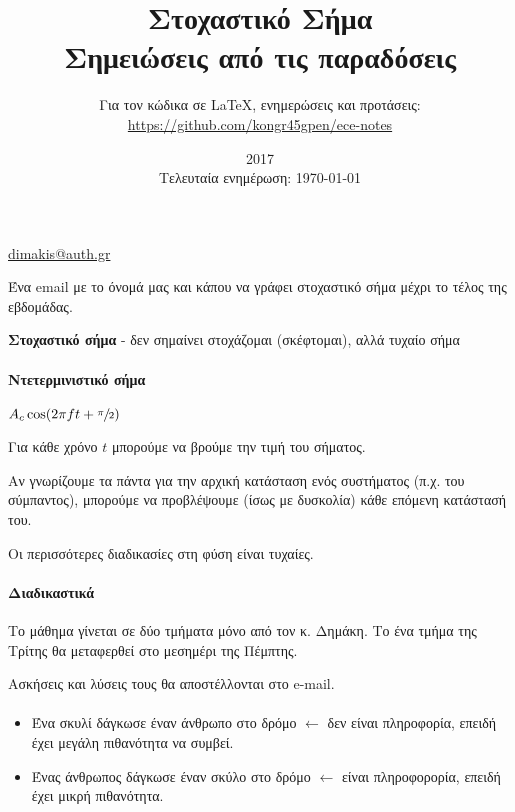\documentclass[11pt,a4paper,notitlepage,fleqn,final]{article}
\title{Στοχαστικό Σήμα
	\\
	{
	\normalsize Σημειώσεις από τις παραδόσεις
	}}
\date{2017
	\\
	{
	\small Τελευταία ενημέρωση: \today
	}
	}
\author{
	Για τον κώδικα σε \LaTeX, ενημερώσεις και προτάσεις:
\\
 \url{https://github.com/kongr45gpen/ece-notes}}
\begin{document}
	\maketitle

	\tableofcontents

	\vspace{50pt}

    \href{mailto:dimakis@auth.gr}{dimakis@auth.gr}
    
    Ένα email με το όνομά μας και κάπου να γράφει στοχαστικό
    σήμα μέχρι το τέλος της εβδομάδας.
    
    \textbf{Στοχαστικό σήμα} - δεν σημαίνει στοχάζομαι
    (σκέφτομαι), αλλά
    τυχαίο σήμα
    
    \paragraph{Ντετερμινιστικό σήμα}
    \( A_c\cos(2\pi f t + \sfrac{\pi}{2}) \)
    
    
    Για κάθε χρόνο \(t\) μπορούμε να βρούμε την τιμή του
    σήματος.
    
    Αν γνωρίζουμε τα πάντα για
    την αρχική κατάσταση ενός συστήματος
    (π.χ. του σύμπαντος), μπορούμε να προβλέψουμε
    (ίσως με δυσκολία) κάθε επόμενη κατάστασή του.
    
    Οι περισσότερες διαδικασίες στη φύση είναι τυχαίες.
    
    \paragraph{Διαδικαστικά}
    Το μάθημα γίνεται σε δύο τμήματα μόνο από τον κ. Δημάκη. Το
    ένα τμήμα της Τρίτης θα μεταφερθεί στο μεσημέρι της Πέμπτης.
    
    Ασκήσεις και λύσεις τους θα αποστέλλονται στο e-mail.
    
    \paragraph{}
    \begin{itemize}
    	\item Ένα σκυλί δάγκωσε έναν άνθρωπο στο δρόμο
    	\( \leftarrow \) δεν είναι πληροφορία, επειδή έχει
    	μεγάλη πιθανότητα να συμβεί.
    	\item Ένας άνθρωπος δάγκωσε έναν σκύλο στο δρόμο
    	\( \leftarrow \) είναι πληροφορορία, επειδή έχει μικρή
    	πιθανότητα.
    \end{itemize}
    
\end{document}
